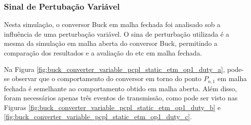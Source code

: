 \subsubsection{Sinal de Pertubação Variável}

Nesta simulação, o conversor Buck em malha fechada foi analisado sob a influência de uma perturbação variável. O sina de  perturbação utilizada é a mesma da simulação em malha aberta do conversor Buck, permitindo a comparação dos resultados e a avaliação do \acrshort{etc} em malha fechada.

Na Figura \ref{fig:buck_converter_variable_pcpl_static_etm_op1_duty_a}, pode-se observar que o comportamento do conversor em torno do ponto $P_{\mathrm{o}, 1}$ em malha fechada é semelhante ao comportamento obtido em malha aberta. Além disso, foram necessários apenas três eventos de transmissão, como pode ser visto nas Figuras \ref{fig:buck_converter_variable_pcpl_static_etm_op1_duty_b} e \ref{fig:buck_converter_variable_pcpl_static_etm_op1_duty_c}.

